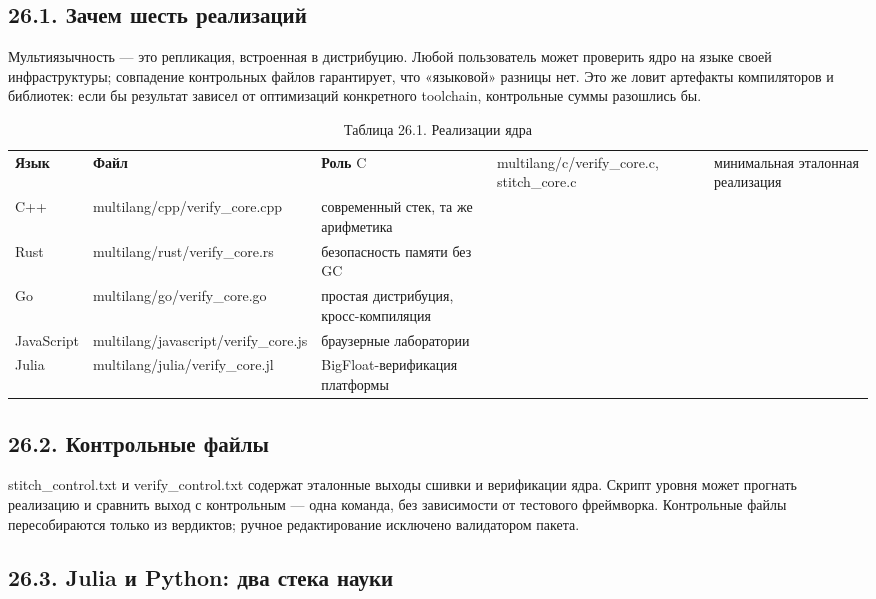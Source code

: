 \documentclass[11pt,a4paper]{article}
\begin{document}
\subsection{26.1. Зачем шесть реализаций}

Мультиязычность — это репликация, встроенная в дистрибуцию. Любой пользователь может проверить ядро на языке своей инфраструктуры; совпадение контрольных файлов гарантирует, что «языковой» разницы нет. Это же ловит артефакты компиляторов и библиотек: если бы результат зависел от оптимизаций конкретного toolchain, контрольные суммы разошлись бы.

\begin{table}[htbp]\centering\small
\caption{Таблица 26.1. Реализации ядра}
\begin{tabular}{p{} p{} p{}}
\toprule
\textbf{Язык} & \textbf{Файл} & \textbf{Роль}
\midrule
C & multilang/c/verify\_core.c, stitch\_core.c & минимальная эталонная реализация \\
C++ & multilang/cpp/verify\_core.cpp & современный стек, та же арифметика \\
Rust & multilang/rust/verify\_core.rs & безопасность памяти без GC \\
Go & multilang/go/verify\_core.go & простая дистрибуция, кросс-компиляция \\
JavaScript & multilang/javascript/verify\_core.js & браузерные лаборатории \\
Julia & multilang/julia/verify\_core.jl & BigFloat-верификация платформы \\
\bottomrule
\end{tabular}
\end{table}

\subsection{26.2. Контрольные файлы}

stitch\_control.txt и verify\_control.txt содержат эталонные выходы сшивки и верификации ядра. Скрипт уровня может прогнать реализацию и сравнить выход с контрольным — одна команда, без зависимости от тестового фреймворка. Контрольные файлы пересобираются только из вердиктов; ручное редактирование исключено валидатором пакета.

\subsection{26.3. Julia и Python: два стека науки}
\end{document}
